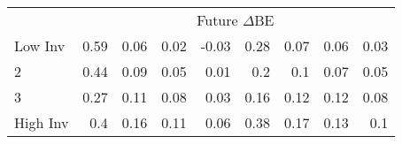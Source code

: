 \begin{table}[!ht]
\begin{tabular}{lrrrrrrrr}
  
    & \multicolumn{8}{c}{Future $\Delta\text{BE}$}  \\
     \cmidrule(r){2-5} \cmidrule(r){6-9}
    Low Inv  & 0.59  & 0.06  & 0.02  & -0.03  & 0.28  & 0.07  & 0.06  & 0.03   \\
    2  & 0.44  & 0.09  & 0.05  & 0.01  & 0.2  & 0.1  & 0.07  & 0.05   \\
    3  & 0.27  & 0.11  & 0.08  & 0.03  & 0.16  & 0.12  & 0.12  & 0.08   \\
    High Inv  & 0.4  & 0.16  & 0.11  & 0.06  & 0.38  & 0.17  & 0.13  & 0.1   \\
    
  
  \bottomrule
\end{tabular}
\label{tbl:Size_BM_Inv_chars}
\end{table}